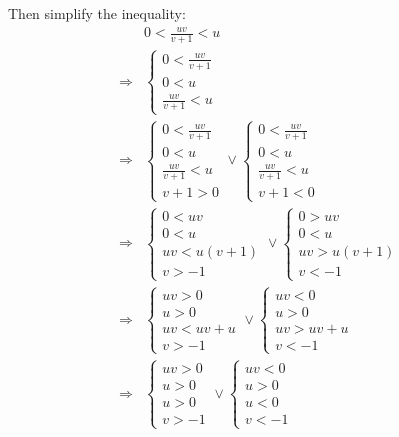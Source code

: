 \documentclass{article}
\begin{document}
\begin{ssolution}
Then simplify the inequality:
\begin{align*}
	& 0 < \frac{uv}{v+1} < u \\
	\Rightarrow& \begin{cases}0 < \frac{uv}{v+1} \\ 0 < u \\ \frac{uv}{v+1} < u\end{cases} \\
	\Rightarrow& \begin{cases}0 < \frac{uv}{v+1} \\ 0 < u \\ \frac{uv}{v+1} < u \\ v+1 > 0\end{cases}
	        \vee \begin{cases}0 < \frac{uv}{v+1} \\ 0 < u \\ \frac{uv}{v+1} < u \\ v+1 < 0\end{cases} \\
	\Rightarrow& \begin{cases}0 < uv \\ 0 < u \\ uv < u(v+1) \\ v > -1\end{cases}
	        \vee \begin{cases}0 > uv \\ 0 < u \\ uv > u(v+1) \\ v < -1\end{cases} \\
	\Rightarrow& \begin{cases}uv > 0 \\ u > 0 \\ uv < uv+u \\ v > -1\end{cases}
	        \vee \begin{cases}uv < 0 \\ u > 0 \\ uv > uv+u \\ v < -1\end{cases} \\
	\Rightarrow& \begin{cases}uv > 0 \\ u > 0 \\ u > 0 \\ v > -1\end{cases}
	        \vee \begin{cases}uv < 0 \\ u > 0 \\ u < 0 \\ v < -1\end{cases} \\

\end{align*}
\end{ssolution}
\end{document}
